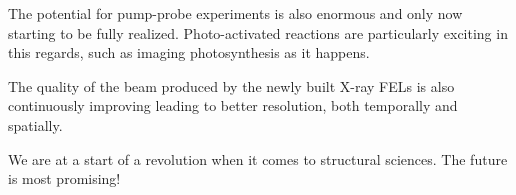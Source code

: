 The potential for pump-probe experiments is also enormous and only now starting to be
fully realized. Photo-activated reactions are particularly exciting in this
regards, such as imaging photosynthesis as it happens.

The quality of the beam produced by the newly built X-ray FELs is also continuously
improving leading to better resolution, both temporally and spatially.

We are at a start of a revolution when it comes to structural sciences. 
The future is most promising!





